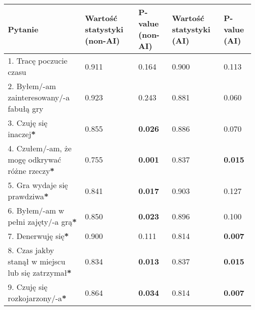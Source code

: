 \begin{table}[h!]
    \begin{center}
        \begin{tabular}{|m{10em}|m{5em}|m{5em}|m{5em}|m{5em}|}
            \hline
            Pytanie                                                                     & Wartość statystyki (non-AI) & P-value (non-AI) & Wartość statystyki (AI) & P-value (AI)   \\
            \hline
            1. Tracę poczucie czasu                                                     & 0.911                       & 0.164            & 0.900                   & 0.113          \\
            2. Byłem/-am \newline zainteresowany/-a fabułą gry                          & 0.923                       & 0.243            & 0.881                   & 0.060          \\
            3. Czuję się inaczej\textbf{*}                                              & 0.855                       & \textbf{0.026}   & 0.886                   & 0.070          \\
            4. Czułem/-am, że mogę odkrywać różne rzeczy\textbf{*}                      & 0.755                       & \textbf{0.001}   & 0.837                   & \textbf{0.015} \\
            5. Gra wydaje się prawdziwa\textbf{*}                                       & 0.841                       & \textbf{0.017}   & 0.903                   & 0.127          \\
            6. Byłem/-am \newline w pełni zajęty/-a grą\textbf{*}                       & 0.850                       & \textbf{0.023}   & 0.896                   & 0.100          \\
            7. Denerwuję się\textbf{*}                                                  & 0.900                       & 0.111            & 0.814                   & \textbf{0.007} \\
            8. Czas jakby stanął w miejscu lub się zatrzymał\textbf{*}                  & 0.834                       & \textbf{0.013}   & 0.837                   & \textbf{0.015} \\
            9. Czuję się \newline rozkojarzony/-a\textbf{*}                             & 0.864                       & \textbf{0.034}   & 0.814                   & \textbf{0.007} \\

\end{tabular}
\end{center}
\end{table}

